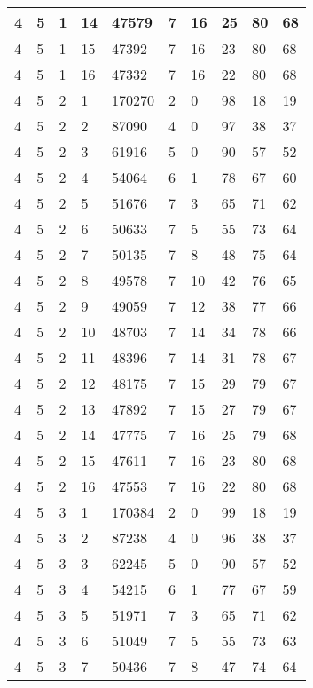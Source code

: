 \begin{table}[!ht]
\begin{tabular}{|l|l|l|l|l|l|l|l|l|l|}
        4 & 5 & 1 & 14 & 47579 & 7 & 16 & 25 & 80 & 68 \\ \hline
        4 & 5 & 1 & 15 & 47392 & 7 & 16 & 23 & 80 & 68 \\ \hline
        4 & 5 & 1 & 16 & 47332 & 7 & 16 & 22 & 80 & 68 \\ \hline
        4 & 5 & 2 & 1 & 170270 & 2 & 0 & 98 & 18 & 19 \\ \hline
        4 & 5 & 2 & 2 & 87090 & 4 & 0 & 97 & 38 & 37 \\ \hline
        4 & 5 & 2 & 3 & 61916 & 5 & 0 & 90 & 57 & 52 \\ \hline
        4 & 5 & 2 & 4 & 54064 & 6 & 1 & 78 & 67 & 60 \\ \hline
        4 & 5 & 2 & 5 & 51676 & 7 & 3 & 65 & 71 & 62 \\ \hline
        4 & 5 & 2 & 6 & 50633 & 7 & 5 & 55 & 73 & 64 \\ \hline
        4 & 5 & 2 & 7 & 50135 & 7 & 8 & 48 & 75 & 64 \\ \hline
        4 & 5 & 2 & 8 & 49578 & 7 & 10 & 42 & 76 & 65 \\ \hline
        4 & 5 & 2 & 9 & 49059 & 7 & 12 & 38 & 77 & 66 \\ \hline
        4 & 5 & 2 & 10 & 48703 & 7 & 14 & 34 & 78 & 66 \\ \hline
        4 & 5 & 2 & 11 & 48396 & 7 & 14 & 31 & 78 & 67 \\ \hline
        4 & 5 & 2 & 12 & 48175 & 7 & 15 & 29 & 79 & 67 \\ \hline
        4 & 5 & 2 & 13 & 47892 & 7 & 15 & 27 & 79 & 67 \\ \hline
        4 & 5 & 2 & 14 & 47775 & 7 & 16 & 25 & 79 & 68 \\ \hline
        4 & 5 & 2 & 15 & 47611 & 7 & 16 & 23 & 80 & 68 \\ \hline
        4 & 5 & 2 & 16 & 47553 & 7 & 16 & 22 & 80 & 68 \\ \hline
        4 & 5 & 3 & 1 & 170384 & 2 & 0 & 99 & 18 & 19 \\ \hline
        4 & 5 & 3 & 2 & 87238 & 4 & 0 & 96 & 38 & 37 \\ \hline
        4 & 5 & 3 & 3 & 62245 & 5 & 0 & 90 & 57 & 52 \\ \hline
        4 & 5 & 3 & 4 & 54215 & 6 & 1 & 77 & 67 & 59 \\ \hline
        4 & 5 & 3 & 5 & 51971 & 7 & 3 & 65 & 71 & 62 \\ \hline
        4 & 5 & 3 & 6 & 51049 & 7 & 5 & 55 & 73 & 63 \\ \hline
        4 & 5 & 3 & 7 & 50436 & 7 & 8 & 47 & 74 & 64 \\ \hline

\end{tabular}
\end{table}
